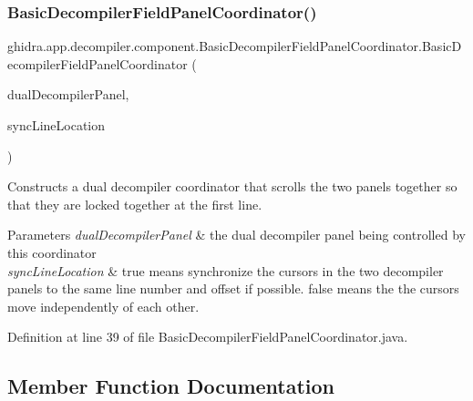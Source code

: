 \subsubsection{\texorpdfstring{BasicDecompilerFieldPanelCoordinator()}{BasicDecompilerFieldPanelCoordinator()}}
{\footnotesize\ttfamily ghidra.\+app.\+decompiler.\+component.\+Basic\+Decompiler\+Field\+Panel\+Coordinator.\+Basic\+Decompiler\+Field\+Panel\+Coordinator (\begin{DoxyParamCaption}\item[{\mbox{\hyperlink{classghidra_1_1app_1_1decompiler_1_1component_1_1_basic_decompiler_code_comparison_panel}{Basic\+Decompiler\+Code\+Comparison\+Panel}}}]{dual\+Decompiler\+Panel,  }\item[{boolean}]{sync\+Line\+Location }\end{DoxyParamCaption})\hspace{0.3cm}{\ttfamily [inline]}}

Constructs a dual decompiler coordinator that scrolls the two panels together so that they are locked together at the first line. 
\begin{DoxyParams}{Parameters}
{\em dual\+Decompiler\+Panel} & the dual decompiler panel being controlled by this coordinator \\
\hline
{\em sync\+Line\+Location} & true means synchronize the cursors in the two decompiler panels to the same line number and offset if possible. false means the the cursors move independently of each other. \\
\hline
\end{DoxyParams}


Definition at line 39 of file Basic\+Decompiler\+Field\+Panel\+Coordinator.\+java.



\subsection{Member Function Documentation}
\mbox{\label{classghidra_1_1app_1_1decompiler_1_1component_1_1_basic_decompiler_field_panel_coordinator_ae1809e04fb7067bf6734d34129071183}} 
